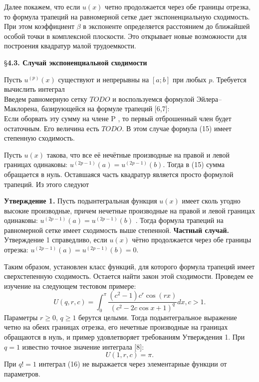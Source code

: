 Далее покажем, что если $u(x)$ четно продолжается через обе границы
отрезка, то формула трапеций на равномерной сетке дает экспоненциальную
сходимость. При этом коэффициент $\beta$ в экспоненте определяется расстоянием
до ближайшей особой точки в комплексной плоскости. Это открывает новые
возможности для построения квадратур малой трудоемкости.

\S \textbf{4.3. Случай экспоненциальной сходимости}

Пусть $u^{(p)}(x)$ существуют и непрерывны на $[a;b]$ при любых $p$. Требуется вычислить интеграл
\begin{equation}
\end{equation}
Введем равномерную сетку $TODO$ и воспользуемся формулой
Эйлера–Маклорена, базирующейся на формуле трапеций [6,7]:
\begin{equation}
\end{equation}
Если оборвать эту сумму на члене P , то первый отброшенный член будет
остаточным. Его величина есть $TODO$. В этом случае формула (15) имеет
степенную сходимость.

Пусть $u(x)$ такова, что все её нечётные производные на правой и левой
границах одинаковы: $u^(2p-1)(a)=u^(2p-1)(b)$. Тогда в (15) сумма обращается в
нуль. Оставшаяся часть квадратур является просто формулой трапеций. Из
этого следуют

\textbf{Утверждение 1.} Пусть подынтегральная функция $u(x)$ имеет сколь
угодно высокие производные, причем нечетные производные на правой и левой
границах одинаковы: $u^(2p-1)(a)=u^(2p-1)(b)$ . Тогда формула трапеций на
равномерной сетке имеет сходимость выше степенной.
\textbf{Частный случай.} Утверждение 1 справедливо, если $u(x)$ чётно
продолжается через обе границы отрезка: $u^(2p-1)(a)=u^(2p-1)(b)=0$.

Таким образом, установлен класс функций, для которого формула
трапеций имеет сверхстепенную сходимость. Остается найти закон этой
сходимости. Проведем ее изучение на следующем тестовом примере:
\begin{equation}
U(q,r,c) = \int_0^{\pi} \frac{(c^2-1)c^r\cos (rx)}{(c^2-2c\cos x+1)^q}dx,c>1.
\end{equation}
Параметры $r \geqslant 0$, $q \geqslant 1$ берутся целыми. Тогда подынтегральное выражение
четно на обеих границах отрезка, его нечетные производные на границах
обращаются в нуль, и пример удовлетворяет требованиям Утверждения 1. При
$q = 1$ известно точное значение интеграла [8]:
\begin{equation}
U(1,r,c) = \pi.
\end{equation}
При $q!=1$ интеграл (16) не выражается через элементарные функции от
параметров.

